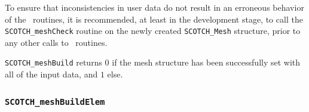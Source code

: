 \begin{itemize}
To ensure that inconsistencies in user data do not result in an
erroneous behavior of the \libscotch\ routines, it is recommended, at
least in the development stage, to call the {\tt SCOTCH\_\lbt mesh\lbt Check}
routine on the newly created {\tt SCOTCH\_\lbt Mesh} structure, prior
to any other calls to \libscotch\ routines.

\progret

{\tt SCOTCH\_meshBuild} returns $0$ if the mesh structure has been
successfully set with all of the input data, and $1$ else.
\end{itemize}

\subsubsection{{\tt SCOTCH\_meshBuildElem}}


